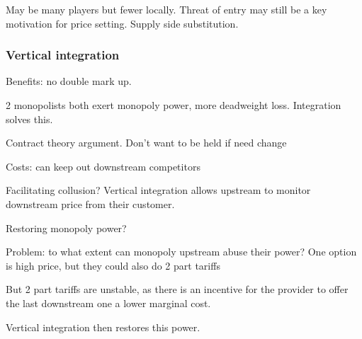 May be many players but fewer locally. Threat of entry may still be a key motivation for price setting. Supply side substitution.

\subsubsection{Vertical integration}

Benefits: no double mark up.

2 monopolists both exert monopoly power, more deadweight loss. Integration solves this.

Contract theory argument. Don’t want to be held if need change

Costs: can keep out downstream competitors

Facilitating collusion? Vertical integration allows upstream to monitor downstream price from their customer.

Restoring monopoly power?

Problem: to what extent can monopoly upstream abuse their power? One option is high price, but they could also do 2 part tariffs

But 2 part tariffs are unstable, as there is an incentive for the provider to offer the last downstream one a lower marginal cost.

Vertical integration then restores this power.

